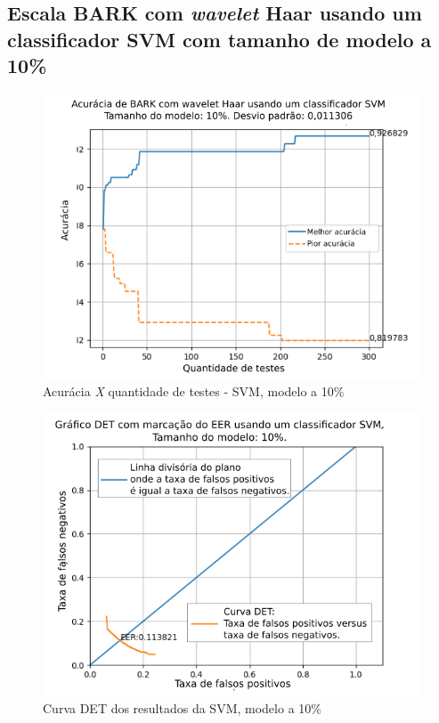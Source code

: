 

\subsection{Escala BARK com \textit{wavelet} Haar usando um classificador SVM com tamanho de modelo a 10\%}


\begin{figure}[H]
	\centering
	\includegraphics[width=.8\linewidth]{images/results/confusionMatrices/classifier_SVM_10.png}
	\caption{Acurácia \textit{X} quantidade de testes - SVM, modelo a 10\%}
	\label{fig:classifiersvm10}
\end{figure}

\begin{figure}[H]
	\centering
	\includegraphics[width=.9\linewidth]{images/results/det/DET_SVM_10}
	\caption{Curva DET dos resultados da SVM, modelo a 10\%}
	\label{fig:detsvm10}
\end{figure}

